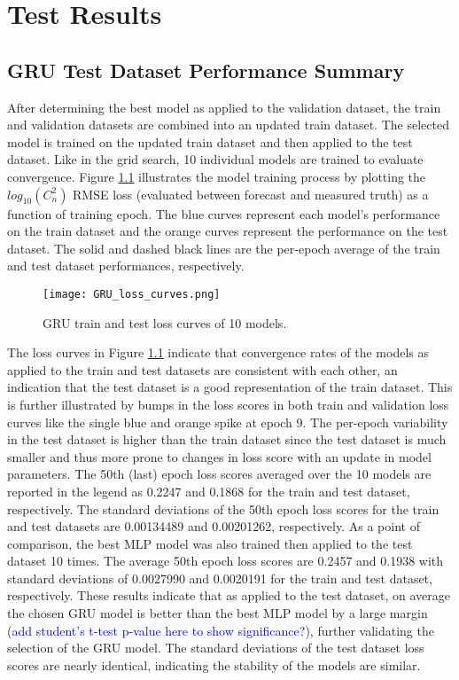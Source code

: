 \chapter{Test Results}
\label{ch5}

\section{GRU Test Dataset Performance Summary}
After determining the best model as applied to the validation dataset, the train and validation datasets are combined into an updated train dataset. The selected model is trained on the updated train dataset and then applied to the test dataset. Like in the grid search, 10 individual models are trained to evaluate convergence. Figure \ref{fig:GRU_train_test_loss_curves} illustrates the model training process by plotting the $log_{10}(C_{n}^{2})$ RMSE loss (evaluated between forecast and measured truth) as a function of training epoch. The blue curves represent each model's performance on the train dataset and the orange curves represent the performance on the test dataset. The solid and dashed black lines are the per-epoch average of the train and test dataset performances, respectively.
\begin{figure}[h!]
	\centering
	\texttt{[image: GRU\_loss\_curves.png]}
	\caption{GRU train and test loss curves of 10 models.}
	\label{fig:GRU_train_test_loss_curves}
\end{figure}
The loss curves in Figure \ref{fig:GRU_train_test_loss_curves} indicate that convergence rates of the models as applied to the train and test datasets are consistent with each other, an indication that the test dataset is a good representation of the train dataset. This is further illustrated by bumps in the loss scores in both train and validation loss curves like the single blue and orange spike at epoch 9. The per-epoch variability in the test dataset is higher than the train dataset since the test dataset is much smaller and thus more prone to changes in loss score with an update in model parameters. The 50th (last) epoch loss scores averaged over the 10 models are reported in the legend as 0.2247 and 0.1868 for the train and test dataset, respectively. The standard deviations of the 50th epoch loss scores for the train and test datasets are 0.00134489 and 0.00201262, respectively. As a point of comparison, the best MLP model was also trained then applied to the test dataset 10 times. The average 50th epoch loss scores are 0.2457 and 0.1938 with standard deviations of 0.0027990 and 0.0020191 for the train and test dataset, respectively. These results indicate that as applied to the test dataset, on average the chosen GRU model is better than the best MLP model by a large margin (\textcolor{blue}{add student's t-test p-value here to show significance?}), further validating the selection of the GRU model. The standard deviations of the test dataset loss scores are nearly identical, indicating the stability of the models are similar.

